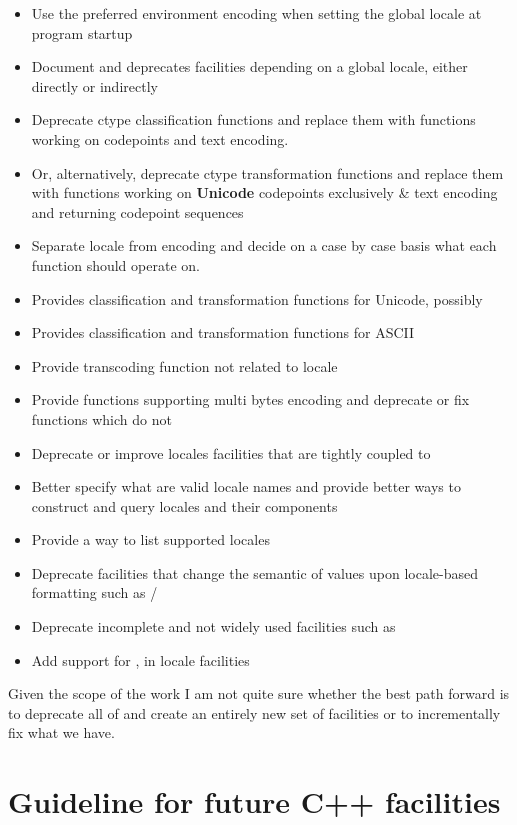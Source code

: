\documentclass{wg21}
\begin{document}
\begin{itemize}
\item Use the preferred environment encoding when setting the global  locale at program startup
\item Document and deprecates facilities depending on a global locale, either directly or indirectly
\item Deprecate ctype classification functions and replace them with functions working on codepoints and text encoding.
\item Or, alternatively, deprecate ctype transformation functions and replace them with functions working on \textbf{Unicode} codepoints exclusively \& text encoding and returning codepoint sequences
\item Separate locale from encoding and decide on a case by case basis what each function should operate on.
\item Provides classification and transformation functions for Unicode, possibly 
\item Provides  classification and transformation functions for ASCII
\item Provide transcoding function not related to locale
\item Provide functions supporting multi bytes encoding and deprecate or fix functions which do not
\item Deprecate or improve locales facilities that are tightly coupled to 
\item Better specify what are valid locale names and provide better ways to construct and query locales and their components
\item Provide a way to list supported locales
\item Deprecate facilities that change the semantic of values upon locale-based formatting such as /
\item Deprecate incomplete and not widely used facilities such as 
\item Add support for ,  in locale facilities
\end{itemize}

Given the scope of the work I am not quite sure whether the best path forward is to deprecate all of  and create an entirely new set of facilities or to incrementally fix what we have.


\section{Guideline for future C++ facilities}
\end{document}
